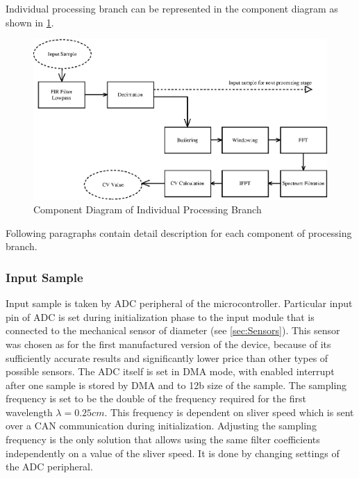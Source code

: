\documentclass[twoside]{ctuthesis}
\theoremstyle{plain}
\theoremstyle{definition}
\theoremstyle{note}
\begin{document}
Individual processing branch can be represented in the component diagram as shown in \ref{fig:singleBranch}.

\begin{figure}[h]
	\centering
	\includegraphics[width=1.0\textwidth]{sliver_singleBranch.eps}
	\caption{Component Diagram of Individual Processing Branch}
	\label{fig:singleBranch}
\end{figure}

Following paragraphs contain detail description for each component of processing branch.

\subsubsection{Input Sample}
Input sample is taken by ADC peripheral of the microcontroller. Particular input pin of ADC is set during initialization phase to the input module that is connected to the mechanical sensor of diameter (see \ref{sec:Sensors}). This sensor was chosen as for the first manufactured version of the device, because of its sufficiently accurate results and significantly lower price than other types of possible sensors. The ADC itself is set in DMA mode, with enabled interrupt after one sample is stored by DMA and to 12b size of the sample.
The sampling frequency is set to be the double of the frequency required for the first wavelength $\lambda=0.25 cm$. This frequency is dependent on sliver speed which is sent over a CAN communication during initialization. Adjusting the sampling frequency is the only solution that allows using the same filter coefficients independently on a value of the sliver speed. It is done by changing settings of the ADC peripheral.
\end{document}
